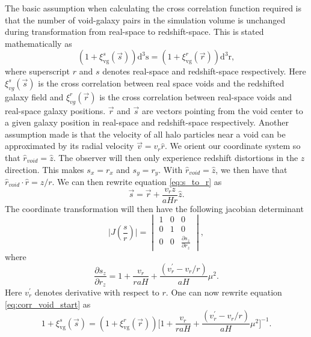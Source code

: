 The basic assumption when calculating the cross correlation function
required is that the number of void-galaxy pairs in the simulation volume is
unchanged during transformation from real-space to redshift-space. This is stated
mathematically as
\begin{equation}\label{eq:corr_void_start}
    (1 + \xi^s_{\mathrm{vg}}(\vec{s}))\mathrm{d}^3\mathrm{s}=(1 + \xi^r_{\mathrm{vg}}(\vec{r}))\mathrm{d}^3\mathrm{r},
\end{equation}
where superscript $r$ and $s$ denotes real-space and redshift-space respectively.
Here $\xi^s_{vg}(\vec{s})$ is the cross correlation between real space voids and
the redshifted galaxy field and $\xi^r_{vg}(\vec{r})$ is the cross correlation
between real-space voids and real-space galaxy positions. $\vec{r}$ and $\vec{s}$
are vectors pointing from the void center to a given galaxy position in
real-space and redshift-space respectively. Another assumption made
is that the velocity of all halo particles near a void can be approximated by
its radial velocity $\vec{v}=v_r \hat{r}$. We orient our coordinate system so that
$\hat{r}_{void}=\hat{z}$. The observer will then only experience redshift
distortions in the $z$ direction. This makes $s_x=r_x$ and $s_y=r_y$. With $\hat{r}_{void}=\hat{z}$, we then have that
$\hat{r}_{void}\cdot\hat{r}=z/r$. We can then rewrite equation \ref{eq:s_to_r}
as
\begin{equation}\label{eq:s_tp_r}
    \vec{s}=\vec{r}+\frac{v_rz}{aHr}\hat{z}.
\end{equation}
The coordinate transformation will then have the
following jacobian determinant
\begin{equation}
    \vert J(\frac{s}{r})\vert=
    \begin{vmatrix}
        1 & 0 & 0\\
        0 & 1 & 0\\
        0 & 0 & \frac{\partial s_z}{\partial r_z} 
    \end{vmatrix},
\end{equation}
where
\begin{equation}
    \frac{\partial s_z}{\partial r_z} = 1 + \frac{v_r}{raH}+\frac{(v_r^\prime-v_r/r)}{aH}\mu^2.
\end{equation}
Here $v_r^\prime$ denotes derivative with respect to $r$. One can now rewrite
equation \ref{eq:corr_void_start} as
\begin{equation}\label{eq:corr_temp}
    1 + \xi^s_{\mathrm{vg}}(\vec{s})=(1 + \xi^r_{\mathrm{vg}}(\vec{r})) \Big[1 + \frac{v_r}{raH}+\frac{(v_r^\prime-v_r/r)}{aH}\mu^2 \Big]^{-1}.
\end{equation}
